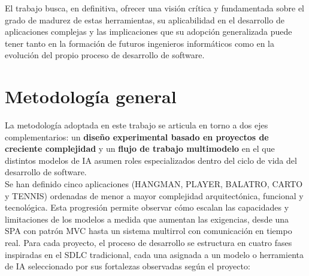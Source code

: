 El trabajo busca, en definitiva, ofrecer una visión crítica y fundamentada sobre el grado de madurez de estas herramientas, su aplicabilidad en el desarrollo de aplicaciones complejas y las implicaciones que su adopción generalizada puede tener tanto en la formación de futuros ingenieros informáticos como en la evolución del propio proceso de desarrollo de software.\\


\section{Metodología general} \label{sec:metodologia-general}

La metodología adoptada en este trabajo se articula en torno a dos ejes complementarios: un \textbf{diseño experimental basado en proyectos de creciente complejidad} y un \textbf{flujo de trabajo multimodelo} en el que distintos modelos de \ac{IA} asumen roles especializados dentro del ciclo de vida del desarrollo de software.\\

Se han definido cinco aplicaciones (\ac{HANGMAN}, \ac{PLAYER}, \ac{BALATRO}, \ac{CARTO} y \ac{TENNIS}) ordenadas de menor a mayor complejidad arquitectónica, funcional y tecnológica. Esta progresión permite observar cómo escalan las capacidades y limitaciones de los modelos a medida que aumentan las exigencias, desde una \ac{SPA} con patrón \ac{MVC} hasta un sistema multirrol con comunicación en tiempo real. Para cada proyecto, el proceso de desarrollo se estructura en cuatro fases inspiradas en el \ac{SDLC} tradicional, cada una asignada a un modelo o herramienta de \ac{IA} seleccionado por sus fortalezas observadas según el proyecto:

